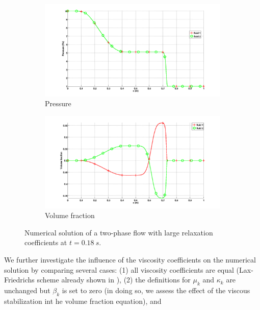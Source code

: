 \documentclass[preprint,10pt]{elsarticle}
\begin{document}
\begin{figure}[H]
        \begin{subfigure}[b]{0.495\textwidth}
                \centering
                \includegraphics[width=\textwidth]{figures/relaxation_two_phases_pressure_fo_lf.png}
                \caption{Pressure}
                \label{fig:two-phase-press}
        \end{subfigure}        
        \begin{subfigure}[b]{0.495\textwidth}
                \centering
                \includegraphics[width=\textwidth]{figures/relaxation_two_phases_volume_fraction_fo_lf.png}
                \caption{Volume fraction}
                \label{fig:two-phase-vf}
        \end{subfigure}
        \caption{Numerical solution of a two-phase flow with large relaxation coefficients at $t=0.18 \ s$.}\label{fig:two-phase}
\end{figure}
%
We further investigate the influence of the viscosity coefficients on the numerical solution by comparing several cases:
(1) all viscosity coefficients are equal (Lax-Friedrichs scheme already shown in ), 
(2) the definitions for $\mu_k$ and $\kappa_k$ are unchanged but $\beta_k$ is set to zero (in doing so, we assess the effect of the viscous stabilization int he volume fraction equation), and 
\end{document}
